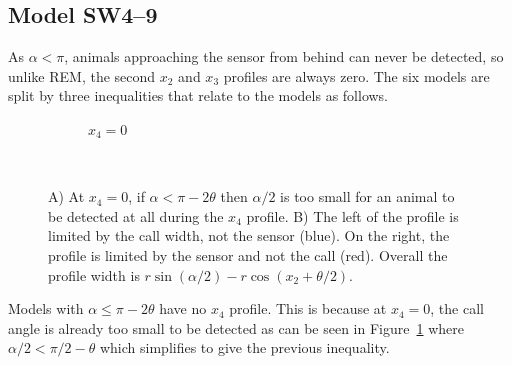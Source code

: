 





\subsection{Model SW4--9} \label{SW4--9}

As $\alpha < \pi$, animals approaching the sensor from behind can never be detected, so unlike REM, the second $x_2$ and $x_3$ profiles are always zero. The six models are split by three inequalities that relate to the models as follows.

\begin{figure}[t]
        \centering

        \begin{subfigure}[t]{0.4\textwidth}
                \centering
                \caption{$x_4=0$}
                \label{f:SW4--9nox4}
        \end{subfigure}
	~
        \begin{subfigure}[t]{0.4\textwidth}
                \centering
                \caption{}
                \label{f:SW4--9fig}
        \end{subfigure}
        
\caption{A) At $x_4 = 0$, if $\alpha < \pi - 2\theta$ then $\alpha/2$ is too small for an animal to be detected at all during the $x_4$ profile. B) The left of the profile is limited by the call width, not the sensor (blue). On the right, the profile is limited by the sensor and not the call (red). Overall the profile width is $r\sin(\alpha/2) - r\cos(x_2 + \theta/2)$.     }
\label{f:SW4--9}
\end{figure}

Models with $\alpha \le \pi - 2\theta$  have no $x_4$ profile. This is because at $x_4 = 0$, the call angle is already too small to be detected as can be seen in Figure~\ref{f:SW4--9nox4} where $\alpha/2 < \pi/2 - \theta$ which simplifies to give the previous inequality.

